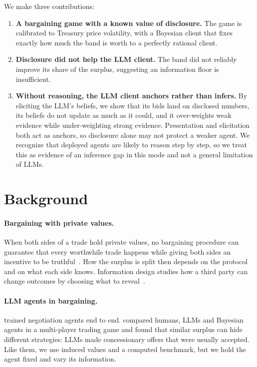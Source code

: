 \documentclass[sigconf]{acmart}
\begin{document}
We make three contributions:

\begin{enumerate}[leftmargin=*, itemsep=0.5em]
  \item \textbf{A bargaining game with a known value of disclosure.} The game is calibrated to Treasury price volatility, with a Bayesian client that fixes exactly how much the band is worth to a perfectly rational client.
  \item \textbf{Disclosure did not help the LLM client.} The band did not reliably improve its share of the surplus, suggesting an information floor is insufficient.
  \item \textbf{Without reasoning, the LLM client anchors rather than infers.} By eliciting the LLM's beliefs, we show that its bids land on disclosed numbers, its beliefs do not update as much as it could, and it over-weights weak evidence while under-weighting strong evidence. Presentation and elicitation both act as anchors, so disclosure alone may not protect a weaker agent. We recognize that deployed agents are likely to reason step by step, so we treat this as evidence of an inference gap in this mode and not a general limitation of LLMs.
\end{enumerate}
\section{Background}

\paragraph{Bargaining with private values.}
When both sides of a trade hold private values, no bargaining procedure can guarantee that every worthwhile trade happens while giving both sides an incentive to be truthful~\cite{myerson1983efficient}. How the surplus is split then depends on the protocol and on what each side knows. Information design studies how a third party can change outcomes by choosing what to reveal~\cite{kamenica2011bayesian}.

\paragraph{LLM agents in bargaining.}
\citet{lewis2017deal} trained negotiation agents end to end. \citet{qian2026strategic} compared humans, LLMs and Bayesian agents in a multi-player trading game and found that similar surplus can hide different strategies: LLMs made concessionary offers that were usually accepted. Like them, we use induced values and a computed benchmark, but we hold the agent fixed and vary its information.
\end{document}
